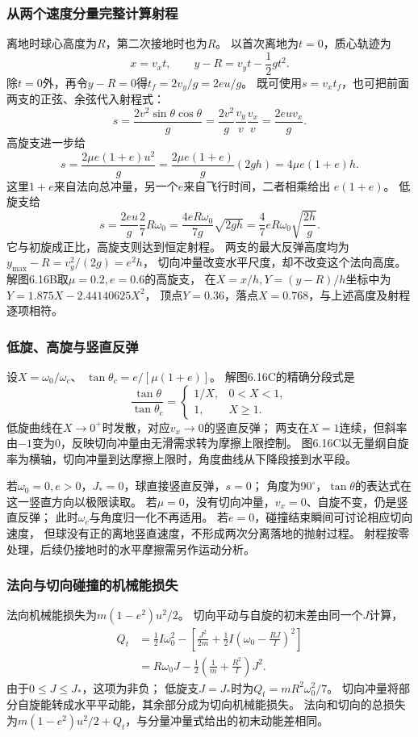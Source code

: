 \documentclass[UTF8,fontset=fandol,a4paper,11pt]{ctexart}
\begin{document}
\subsubsection*{从两个速度分量完整计算射程}
离地时球心高度为$R$，第二次接地时也为$R$。
以首次离地为$t=0$，质心轨迹为
\[
x=v_xt,\qquad y-R=v_yt-\frac12gt^2.
\]
除$t=0$外，再令$y-R=0$得$t_f=2v_y/g=2eu/g$。
既可使用$s=v_xt_f$，也可把前面两支的正弦、余弦代入射程式：
\[
s=\frac{2v^2\sin\theta\cos\theta}{g}
=\frac{2v^2}{g}\frac{v_y}{v}\frac{v_x}{v}
=\frac{2euv_x}{g}.
\]
高旋支进一步给
\[
s=\frac{2\mu e(1+e)u^2}{g}
=\frac{2\mu e(1+e)}g(2gh)=4\mu e(1+e)h.
\]
这里$1+e$来自法向总冲量，另一个$e$来自飞行时间，二者相乘给出 $e(1+e)$。
低旋支给
\[
s=\frac{2eu}{g}\frac27R\omega_0
=\frac{4eR\omega_0}{7g}\sqrt{2gh}
=\frac47eR\omega_0\sqrt{\frac{2h}{g}}.
\]
它与初旋成正比，高旋支则达到恒定射程。
两支的最大反弹高度均为
$y_{\max}-R=v_y^2/(2g)=e^2h$，
切向冲量改变水平尺度，却不改变这个法向高度。
解图6.16B取$\mu=0.2,e=0.6$的高旋支，
在$X=x/h,Y=(y-R)/h$坐标中为
$Y=1.875X-2.44140625X^2$，
顶点$Y=0.36$，落点$X=0.768$，与上述高度及射程逐项相符。

\subsubsection*{低旋、高旋与竖直反弹}
设$X=\omega_0/\omega_c$、
$\tan\theta_c=e/[\mu(1+e)]$。
解图6.16C的精确分段式是
\[
\frac{\tan\theta}{\tan\theta_c}
=\begin{cases}1/X,&0<X<1,\\1,&X\geq1.\end{cases}
\]
低旋曲线在$X\to0^+$时发散，对应$v_x\to0$的竖直反弹；
两支在$X=1$连续，但斜率由$-1$变为0，反映切向冲量由无滑需求转为摩擦上限控制。
图6.16C以无量纲自旋率为横轴，切向冲量到达摩擦上限时，角度曲线从下降段接到水平段。

若$\omega_0=0,e>0$，$J_*=0$，球直接竖直反弹，$s=0$；
角度为$90^\circ$，$\tan\theta$的表达式在这一竖直方向以极限读取。
若$\mu=0$，没有切向冲量，$v_x=0$、自旋不变，仍是竖直反弹；
此时$\omega_c$与角度归一化不再适用。
若$e=0$，碰撞结束瞬间可讨论相应切向速度，
但球没有正的离地竖直速度，不形成两次分离落地的抛射过程。
射程按零处理，后续仍接地时的水平摩擦需另作运动分析。

\subsubsection*{法向与切向碰撞的机械能损失}
法向机械能损失为$m(1-e^2)u^2/2$。
切向平动与自旋的初末差由同一个$J$计算，
\[
\begin{aligned}
Q_t&=\frac12I\omega_0^2-
\left[\frac{J^2}{2m}+\frac12I\left(\omega_0-\frac{RJ}{I}\right)^2\right]\\
&=R\omega_0J-\frac12\left(\frac1m+\frac{R^2}{I}\right)J^2.
\end{aligned}
\]
由于$0\leq J\leq J_*$，这项为非负；
低旋支$J=J_*$时为$Q_t=mR^2\omega_0^2/7$。
切向冲量将部分自旋能转成水平平动能，其余部分成为切向机械能损失。
法向和切向的总损失为$m(1-e^2)u^2/2+Q_t$，与分量冲量式给出的初末动能差相同。
\end{document}
